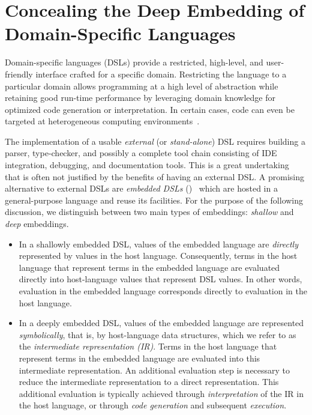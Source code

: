 
\chapter{Concealing the Deep Embedding of Domain-Specific Languages}

Domain-specific languages (DSLs) provide a restricted,
high-level, and user-friendly interface crafted for a specific domain.
Restricting the language to a particular domain allows programming at
a high level of abstraction while retaining good run-time performance
by leveraging domain knowledge for optimized code generation or
interpretation.  In certain cases, code can even be targeted at
heterogeneous computing environments~\cite{rompf_optimizing_2013}.

The implementation of a usable \emph{external} (or \emph{stand-alone})
DSL requires building a parser, type-checker, and possibly a complete
tool chain consisting of IDE integration, debugging, and documentation
tools. This is a great undertaking that is often not justified by the
benefits of having an external DSL.  A promising alternative to
external DSLs are \emph{embedded DSLs} (\edsls)~\cite{Hudak96csur}
which are hosted in a general-purpose language and reuse its
facilities. For the purpose of the following discussion, we
distinguish between two main types of embeddings: \emph{shallow} and
\emph{deep} embeddings.

  \begin{itemize}
  \item In a shallowly embedded DSL, values of the embedded language
    are \emph{directly} represented by values in the host language.
    Consequently, terms in the host language that represent terms in
    the embedded language are evaluated directly into host-language
    values that represent DSL values. In other words, evaluation in
    the embedded language corresponds directly to evaluation in the
    host language.
  \item In a deeply embedded DSL, values of the embedded language are
    represented \emph{symbolically}, that is, by host-language data
    structures, which we refer to as the \emph{intermediate
      representation (IR)}. Terms in the host language that represent
    terms in the embedded language are evaluated into this intermediate
    representation. An additional evaluation step is necessary to
    reduce the intermediate representation to a direct representation.
    This additional evaluation is typically achieved through
    \emph{interpretation} of the IR in the host language, or through
    \emph{code generation} and subsequent \emph{execution}.
  \end{itemize}

